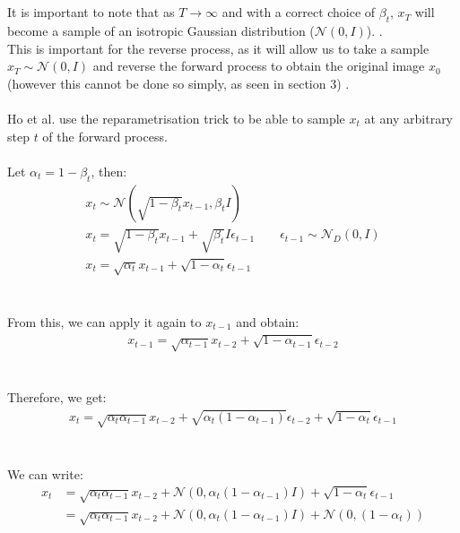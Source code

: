 \documentclass{article}
\begin{document}
\\\\
It is important to note that as $T \rightarrow \infty$ and with a correct choice of $\beta_t$,  $x_T$ will become a sample of an isotropic Gaussian distribution ($\mathcal{N}\left(0, I\right)$). \cite{nichol2021improved} \cite{sohldickstein2015deep}. \\
This is important for the reverse process, as it will allow us to take a sample $x_T \sim \mathcal{N}\left(0, I\right)$ and reverse the forward process to obtain the original image $x_0$ (however this cannot be done so simply, as seen in section 3) \cite{nichol2021improved}.
\\\\
Ho et al. \cite{ho2020denoising} use the reparametrisation trick to be able to sample $x_t$ at any arbitrary step $t$ of the forward process.
\\\\
Let $\alpha_t = 1 - \beta_t$, then:
\begin{gather*}
  x_t \sim \mathcal{N}\left(\sqrt{1 - \beta_t} x_{t-1}, \beta_t I\right) \\
  x_t = \sqrt{1 - \beta_t} x_{t-1} + \sqrt{\beta_t }I \epsilon_{t-1} \qquad \epsilon_{t - 1} \sim \mathcal{N}_D \left(0, I\right) \\
  x_t = \sqrt{\alpha_t} x_{t-1} + \sqrt{1 - \alpha_t} \epsilon_{t - 1}
\end{gather*}
\\\\
From this, we can apply it again to $x_{t-1}$ and obtain:
\begin{gather*}
  x_{t-1} = \sqrt{\alpha_{t-1}} x_{t-2} + \sqrt{1 - \alpha_{t-1}} \epsilon_{t - 2}
\end{gather*}
\\\\
Therefore, we get:
\begin{gather*}
  x_t = \sqrt{\alpha_t \alpha_{t-1}} x_{t-2} + \sqrt{\alpha_t\left(1 - \alpha_{t-1}\right)} \epsilon_{t - 2} + \sqrt{1 - \alpha_t} \epsilon_{t - 1}
\end{gather*}
\\\\
We can write:
\begin{align}
  x_t &= \sqrt{\alpha_t \alpha_{t-1}} x_{t-2} + \mathcal{N}\left(0, \alpha_t\left(1 - \alpha_{t-1}\right)I \right) + \sqrt{1 - \alpha_t} \epsilon_{t - 1} \\
&= \sqrt{\alpha_t \alpha_{t-1}} x_{t-2} + \mathcal{N}\left(0, \alpha_t\left(1 - \alpha_{t-1}\right)I\right) + \mathcal{N}\left(0, (1 - \alpha_t) \right)
\end{align}
\end{document}
